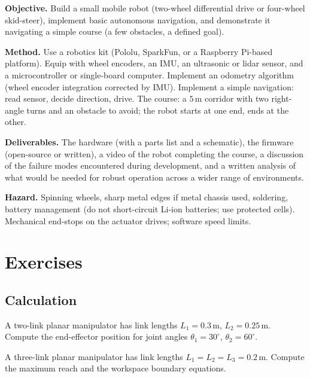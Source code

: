 \begin{project}
\textbf{Objective.} Build a small mobile robot (two-wheel differential drive or four-wheel skid-steer), implement basic autonomous navigation, and demonstrate it navigating a simple course (a few obstacles, a defined goal).

\textbf{Method.} Use a robotics kit (Pololu, SparkFun, or a Raspberry Pi-based platform). Equip with wheel encoders, an IMU, an ultrasonic or lidar sensor, and a microcontroller or single-board computer. Implement an odometry algorithm (wheel encoder integration corrected by IMU). Implement a simple navigation: read sensor, decide direction, drive. The course: a $5\,\text{m}$ corridor with two right-angle turns and an obstacle to avoid; the robot starts at one end, ends at the other.

\textbf{Deliverables.} The hardware (with a parts list and a schematic), the firmware (open-source or written), a video of the robot completing the course, a discussion of the failure modes encountered during development, and a written analysis of what would be needed for robust operation across a wider range of environments.

\textbf{Hazard.} Spinning wheels, sharp metal edges if metal chassis used, soldering, battery management (do not short-circuit Li-ion batteries; use protected cells). Mechanical end-stops on the actuator drives; software speed limits.
\end{project}

\section{Exercises}

\subsection*{Calculation}

\begin{exercise}
A two-link planar manipulator has link lengths $L_1 = 0.3\,\text{m}$, $L_2 = 0.25\,\text{m}$. Compute the end-effector position for joint angles $\theta_1 = 30^\circ$, $\theta_2 = 60^\circ$.
\end{exercise}

\begin{exercise}
A three-link planar manipulator has link lengths $L_1 = L_2 = L_3 = 0.2\,\text{m}$. Compute the maximum reach and the workspace boundary equations.
\end{exercise}

